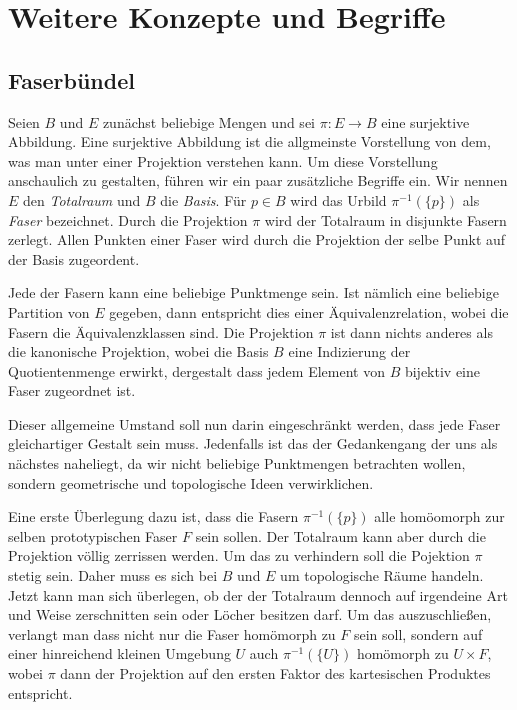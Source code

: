

\chapter{Weitere Konzepte und Begriffe}

\section{Faserbündel}

Seien $B$ und $E$ zunächst beliebige Mengen und sei $\pi\colon E\to B$
eine surjektive Abbildung. Eine surjektive Abbildung ist die allgmeinste
Vorstellung von dem, was man unter einer Projektion verstehen kann.
Um diese Vorstellung anschaulich zu gestalten, führen wir ein paar
zusätzliche Begriffe ein. Wir nennen $E$ den \emph{Totalraum} und $B$
die \emph{Basis}. Für $p\in B$ wird das Urbild $\pi^{-1}(\{p\})$ als
\emph{Faser} bezeichnet. Durch die Projektion $\pi$ wird der Totalraum
in disjunkte Fasern zerlegt. Allen Punkten einer Faser wird durch
die Projektion der selbe Punkt auf der Basis zugeordent.

Jede der Fasern kann eine beliebige Punktmenge sein. Ist nämlich eine
beliebige Partition von $E$ gegeben, dann entspricht dies einer
Äquivalenzrelation, wobei die Fasern die Äquivalenzklassen sind.
Die Projektion $\pi$ ist dann nichts anderes als die kanonische
Projektion, wobei die Basis $B$ eine Indizierung der Quotientenmenge
erwirkt, dergestalt dass jedem Element von $B$ bijektiv eine Faser
zugeordnet ist.

Dieser allgemeine Umstand soll nun darin eingeschränkt werden, dass
jede Faser gleichartiger Gestalt sein muss. Jedenfalls ist das der
Gedankengang der uns als nächstes naheliegt, da wir nicht beliebige
Punktmengen betrachten wollen, sondern geometrische und topologische
Ideen verwirklichen.

Eine erste Überlegung dazu ist, dass die Fasern $\pi^{-1}(\{p\})$ alle
homöomorph zur selben prototypischen Faser $F$ sein sollen. Der
Totalraum kann aber durch die Projektion völlig zerrissen werden.
Um das zu verhindern soll die Pojektion $\pi$ stetig sein. Daher muss
es sich bei $B$ und $E$ um topologische Räume handeln. Jetzt kann man
sich überlegen, ob der der Totalraum dennoch auf irgendeine Art und
Weise zerschnitten sein oder Löcher besitzen darf. Um das auszuschließen,
verlangt man dass nicht nur die Faser homömorph zu $F$ sein soll,
sondern auf einer hinreichend kleinen Umgebung $U$ auch
$\pi^{-1}(\{U\})$ homömorph zu $U\times F$, wobei $\pi$ dann der
Projektion auf den ersten Faktor des kartesischen Produktes
entspricht.


